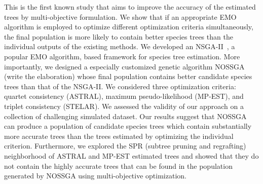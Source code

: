 This is the first known study that aims to improve the accuracy of the estimated trees by multi-objective formulation. We show that if an appropriate EMO algorithm is employed to optimize different optimization criteria simultaneously, the final population is more likely to contain better species trees than the individual outputs of the existing methods. We developed an NSGA-II~\cite{deb2002fast}, a popular EMO algorithm, based framework for species tree estimation. More importantly, we designed a especially customized genetic algorithm NOSSGA (write the elaboration) whose final population contains better candidate species trees than that of the NSGA-II.  %
We considered three optimization criteria: quartet consistency (ASTRAL), maximum pseudo-likelihood (MP-EST), and triplet consistency (STELAR). We assessed the validity of our approach on a collection of challenging simulated dataset. Our results suggest that NOSSGA can produce a population of candidate species trees which contain substantially more accurate trees than the trees estimated by optimizing the individual criterion. Furthermore, we explored the SPR (subtree pruning and regrafting) neighborhood of ASTRAL and MP-EST estimated trees and showed that they do not contain the highly accurate trees that can be found in the population generated by NOSSGA using multi-objective optimization.




\begin{comment}
\begin{itemize}
	\item We pick three optimization scores from three different methods (ASTRAL, STELAR and MP-EST) to be simultaneously optimized by an EMO algorithm (Section~\ref{sec:problem}).  
	\item We developed an NSGA-II~\cite{deb2002fast}, a popular EMO algorithm, based  framework. Also, based on obtained observations, we designed a custom genetic algorithm whose final population contains better species tree than that of the NSGA-II (Section~\ref{sec:method}). 
	\item Finally based on three simulated datasets, we examine the operation of the two EMO algorithms and then compare their performance with three existing methods (Section~\ref{sec:experiment}). 
\end{itemize}
\end{comment}


